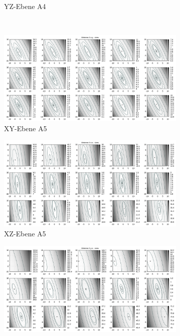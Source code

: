 \begin{appendix}
\begin{landscape}
\begin{figure}[!ht]
\begin{subfigure}[t]{0.5\textwidth}
				\caption{YZ-Ebene A4}
	\end{subfigure}
	\\
	\centering
		\begin{subfigure}[t]{0.5\textwidth}
		     \centering
		     \includegraphics[width=\textwidth]{img/fitness/xy/a4.png}
		             \caption{XY-Ebene A5}
		\end{subfigure}
		\begin{subfigure}[t]{0.5\textwidth}
			\centering
		     \includegraphics[width=\textwidth]{img/fitness/xz/a4.png}
					\caption{XZ-Ebene A5}
		\end{subfigure}
		\begin{subfigure}[t]{0.5\textwidth}
				\centering
		   \includegraphics[width=\textwidth]{img/fitness/yz/a4.png}

\end{subfigure}
\end{figure}
\end{landscape}
\end{appendix}
